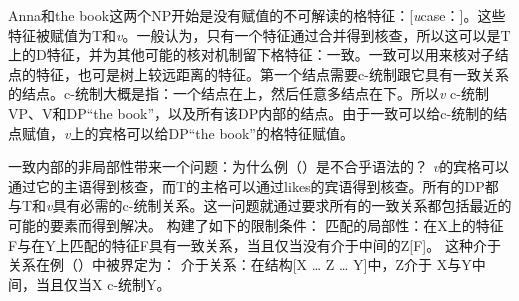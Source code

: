 Anna和the book这两个NP开始是没有赋值的不可解读的格特征：[\textit{u}case：]。这些特征被赋值为T和\textit{v}。一般认为，只有一个特征通过合并得到核查，所以这可以是T上的D特征，并为其他可能的核对机制留下格特征：一致。一致可以用来核对子结点的特征，也可是树上较远距离的特征。第一个结点需要c-统制跟它具有一致关系的结点。c-统制大概是指：一个结点在上，然后任意多结点在下。所以\textit{v} c-统制VP、V和DP“the book”，以及所有该DP内部的结点。由于一致可以给c-统制的结点赋值，\textit{v}上的宾格可以给DP“the book”的格特征赋值。

一致内部的非局部性带来一个问题：为什么例（）是不合乎语法的？
\z
\textit{v}的宾格可以通过它的主语得到核查，而T的主格可以通过likes的宾语得到核查。所有的DP都与T和\textit{v}具有必需的c-统制关系。这一问题就通过要求所有的一致关系都包括最近的可能的要素而得到解决。 \citet[]{Adger2003a}构建了如下的限制条件：
\ea
\label{principle-locality-of-matching}
匹配的局部性：在X上的特征F与在Y上匹配的特征F具有一致关系，当且仅当没有介于中间的Z[F]。
\z
这种介于关系在例（）中被界定为：
\ea
\label{def-intervention}
介于关系：在结构[X \ldots{} Z \ldots{} Y]中，Z介于 X与Y中间，当且仅当X c-统制Y。
\z

